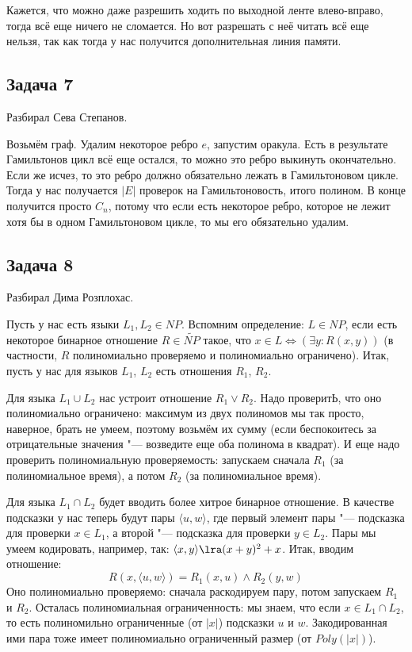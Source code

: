 	\begin{Rem}
		Кажется, что можно даже разрешить ходить по выходной ленте влево-вправо, тогда
		всё еще ничего не сломается.
		Но вот разрешать с неё читать всё еще нельзя, так как тогда у нас получится дополнительная линия памяти.
	\end{Rem}

\subsection{Задача 7}
	Разбирал Сева Степанов.

	Возьмём граф.
	Удалим некоторое ребро $e$, запустим оракула.
	Есть в результате Гамильтонов цикл всё еще остался, то можно это ребро выкинуть окончательно.
	Если же исчез, то это ребро должно обязательно лежать в Гамильтоновом цикле.
	Тогда у нас получается $|E|$ проверок на Гамильтоновость, итого полином.
	В конце получится просто $C_n$, потому что если есть некоторое ребро, которое не лежит хотя
	бы в одном Гамильтоновом цикле, то мы его обязательно удалим.

\subsection{Задача 8}
	Разбирал Дима Розплохас.

	Пусть у нас есть языки $L_1, L_2 \in NP$.
	Вспомним определение: $L \in NP$, если есть некоторое бинарное отношение $R \in \widetilde{NP}$
	такое, что $x \in L \iff (\exists y \colon R(x, y))$ (в частности, $R$ полиномиально проверяемо
	и полиномиально ограничено).
	Итак, пусть у нас для языков $L_1$, $L_2$ есть отношения $R_1$, $R_2$.

	Для языка $L_1 \cup L_2$ нас устроит отношение $R_1 \lor R_2$.
	Надо проверитЬ, что оно полиномиально ограничено: максимум из двух полиномов мы так просто, наверное, брать не умеем,
	поэтому возьмём их сумму (если беспокоитесь за отрицательные значения "--- возведите еще оба полинома в квадрат).
	И еще надо проверить полиномиальную проверяемость: запускаем сначала $R_1$ (за полиномиальное время),
	а потом $R_2$ (за полиномиальное время).

	Для языка $L_1 \cap L_2$ будет вводить более хитрое бинарное отношение.
	В качестве подсказки у нас теперь будут пары $\langle u, w \rangle$,
	где первый элемент пары "--- подсказка для проверки $x \in L_1$,
	а второй "--- подсказка для проверки $y \in L_2$.
	Пары мы умеем кодировать, например, так: $\langle x, y \rangle \lra (x+y)^2+x$.
	Итак, вводим отношение:
	\[ R(x, \langle u, w \rangle) = R_1(x, u) \land R_2(y, w) \]
	Оно полиномиально проверяемо: сначала раскодируем пару, потом запускаем $R_1$ и $R_2$.
	Осталась полиномиальная ограниченность: мы знаем, что если $x \in L_1 \cap L_2$,
	то есть полиномильно ограниченные (от $|x|$) подсказки $u$ и $w$.
	Закодированная ими пара тоже имеет полиномиально ограниченный размер (от $Poly(|x|)$).


